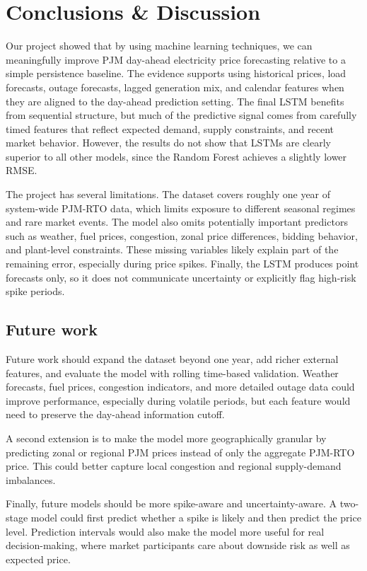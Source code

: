 \documentclass{article}
\begin{document}
\section{Conclusions \& Discussion}

Our project showed that by using machine learning techniques, we can meaningfully improve PJM day-ahead electricity price forecasting relative to a simple persistence baseline. The evidence supports using historical prices, load forecasts, outage forecasts, lagged generation mix, and calendar features when they are aligned to the day-ahead prediction setting. The final LSTM benefits from sequential structure, but much of the predictive signal comes from carefully timed features that reflect expected demand, supply constraints, and recent market behavior. However, the results do not show that LSTMs are clearly superior to all other models, since the Random Forest achieves a slightly lower RMSE.

The project has several limitations. The dataset covers roughly one year of system-wide PJM-RTO data, which limits exposure to different seasonal regimes and rare market events. The model also omits potentially important predictors such as weather, fuel prices, congestion, zonal price differences, bidding behavior, and plant-level constraints. These missing variables likely explain part of the remaining error, especially during price spikes. Finally, the LSTM produces point forecasts only, so it does not communicate uncertainty or explicitly flag high-risk spike periods.

\subsection{Future work}

Future work should expand the dataset beyond one year, add richer external features, and evaluate the model with rolling time-based validation. Weather forecasts, fuel prices, congestion indicators, and more detailed outage data could improve performance, especially during volatile periods, but each feature would need to preserve the day-ahead information cutoff.

A second extension is to make the model more geographically granular by predicting zonal or regional PJM prices instead of only the aggregate PJM-RTO price. This could better capture local congestion and regional supply-demand imbalances.

Finally, future models should be more spike-aware and uncertainty-aware. A two-stage model could first predict whether a spike is likely and then predict the price level. Prediction intervals would also make the model more useful for real decision-making, where market participants care about downside risk as well as expected price.
\end{document}
